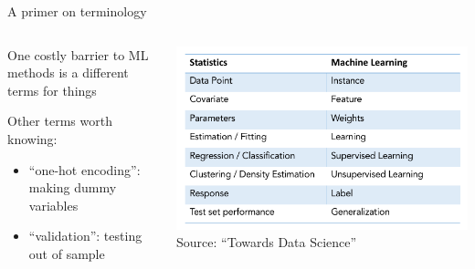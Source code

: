 \documentclass[notes,11pt, aspectratio=169]{beamer}
\newenvironment{wideitemize}{\itemize\addtolength{\itemsep}{10pt}}{\enditemize}
\begin{document}
\begin{frame}{A primer on terminology}
    \begin{columns}[onlytextwidth, T] %
      \begin{column}{.5\textwidth}
        \begin{wideitemize}
        \item One costly barrier to ML methods is a different terms for things
        \item Other terms worth knowing:
          \begin{itemize}
          \item ``one-hot encoding'': making dummy variables
          \item ``validation'': testing out of sample
          \end{itemize}
        \end{wideitemize}
      \end{column}%
      \hfill%
      \begin{column}{.5\textwidth}
        \includegraphics[width=\linewidth]{images/terminology_1.png}
        Source: ``Towards Data Science''
      \end{column}%
    \end{columns}
\end{frame}
\end{document}
